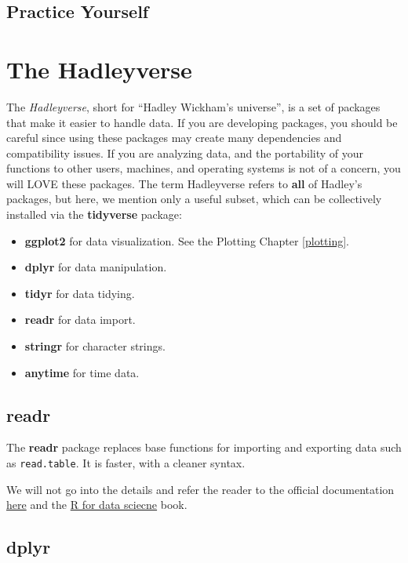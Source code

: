 \documentclass[]{book}
\providecommand{\tightlist}{%
  \setlength{\itemsep}{0pt}\setlength{\parskip}{0pt}}
\theoremstyle{definition}
\theoremstyle{definition}
\theoremstyle{definition}
\theoremstyle{remark}
\begin{document}
\section{Practice Yourself}\label{practice-yourself-18}

\chapter{The Hadleyverse}\label{hadley}

The \emph{Hadleyverse}, short for ``Hadley Wickham's universe'', is a
set of packages that make it easier to handle data. If you are
developing packages, you should be careful since using these packages
may create many dependencies and compatibility issues. If you are
analyzing data, and the portability of your functions to other users,
machines, and operating systems is not of a concern, you will LOVE these
packages. The term Hadleyverse refers to \textbf{all} of Hadley's
packages, but here, we mention only a useful subset, which can be
collectively installed via the \textbf{tidyverse} package:

\begin{itemize}
\tightlist
\item
  \textbf{ggplot2} for data visualization. See the Plotting Chapter
  \ref{plotting}.
\item
  \textbf{dplyr} for data manipulation.
\item
  \textbf{tidyr} for data tidying.
\item
  \textbf{readr} for data import.
\item
  \textbf{stringr} for character strings.
\item
  \textbf{anytime} for time data.
\end{itemize}

\section{readr}\label{readr}

The \textbf{readr} package \citep{readr} replaces base functions for
importing and exporting data such as \texttt{read.table}. It is faster,
with a cleaner syntax.

We will not go into the details and refer the reader to the official
documentation
\href{http://readr.tidyverse.org/articles/readr.html}{here} and the
\href{http://r4ds.had.co.nz/data-import.html}{R for data sciecne} book.

\section{dplyr}\label{dplyr}
\end{document}
